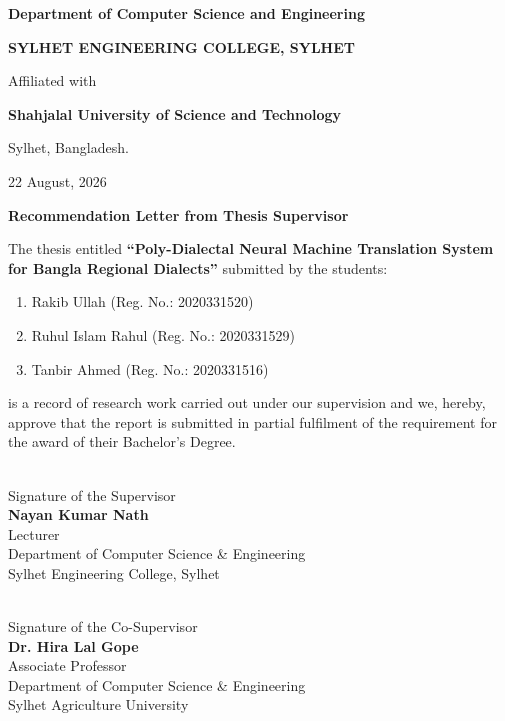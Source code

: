 \documentclass[12pt,a4paper]{article}
\begin{document}
\begin{titlepage}
    {\large \textbf{Department of Computer Science and Engineering}\par}
    \vspace{0.1cm}
    {\Large \textbf{SYLHET ENGINEERING COLLEGE, SYLHET}\par}
    \vspace{0.2cm}
    {\large Affiliated with\par}
    \vspace{0.1cm}
    {\large \textbf{Shahjalal University of Science and Technology}\par}
    {\large Sylhet, Bangladesh.\par}
    \vspace{0.4cm}
    {\large 22 August, 2026\par}
    
\end{titlepage}

\newpage
\thispagestyle{empty}
\begin{center}
    \Large \textbf{Recommendation Letter from Thesis Supervisor}
\end{center}
\vspace{1.5cm}

The thesis entitled \textbf{``Poly-Dialectal Neural Machine Translation System for Bangla Regional Dialects''} submitted by the students:
\begin{enumerate}
    \item Rakib Ullah (Reg. No.: 2020331520)
    \item Ruhul Islam Rahul (Reg. No.: 2020331529)
    \item Tanbir Ahmed (Reg. No.: 2020331516)
\end{enumerate}
is a record of research work carried out under our supervision and we, hereby, approve that the report is submitted in partial fulfilment of the requirement for the award of their Bachelor's Degree.

\vspace{3.5cm}

\noindent
\begin{minipage}[t]{0.48\textwidth}
    \noindent\makebox[2.5in]{\hrulefill} \\
    Signature of the Supervisor \\
    \textbf{Nayan Kumar Nath} \\
    Lecturer \\
    Department of Computer Science \& Engineering \\
    Sylhet Engineering College, Sylhet
\end{minipage}
\hfill
\begin{minipage}[t]{0.48\textwidth}
    \noindent\makebox[2.5in]{\hrulefill} \\
    Signature of the Co-Supervisor \\
    \textbf{Dr. Hira Lal Gope} \\
    Associate Professor \\
    Department of Computer Science \& Engineering \\
    Sylhet Agriculture University
\end{minipage}
\end{document}
